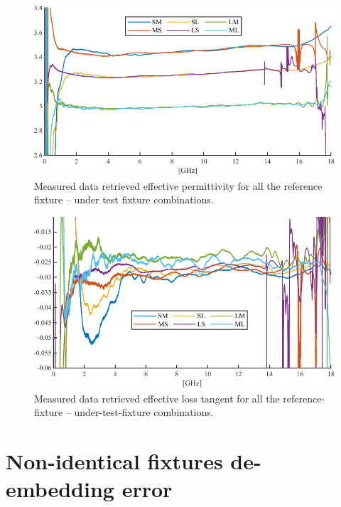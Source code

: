 \documentclass[11pt,a4paper]{article}
\begin{document}
    \begin{figure}[!tb]
        \includegraphics[width=\textwidth]{epsimeas}
        \caption{Measured data retrieved effective permittivity for all the reference fixture -- under test fixture combinations.}
        \label{fig:epsilonmeas}
    \end{figure}
    \begin{figure}[!tb]
        \includegraphics[width=\textwidth]{tandmeas}
        \caption{Measured data retrieved effective loss tangent for all the reference-fixture -- under-test-fixture combinations.}
        \label{fig:tandmeas}
    \end{figure}


    \section{Non-identical fixtures de-embedding error}
    \label{sec:error}
\end{document}
